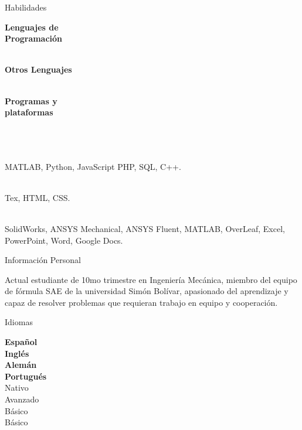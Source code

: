 \documentclass[10pt]{article}
\begin{document}
\begin{multicols}{2}
    \begin{LARGE}
        \color{blue!50!black}Habilidades\par
    \end{LARGE}
    \begin{vwcol}[widths={0.4,0.6},
 sep=0cm,rule=0pt,indent=0em,lines=10]
        \textbf{Lenguajes de \\
        Programación}\par\hfill\\
        \textbf{Otros Lenguajes}\par\hfill\\
        \textbf{Programas y\\ plataformas}\par\hfill\\\hfill\\\hfill\\
        MATLAB, Python, JavaScript PHP, SQL, C++.\par\hfill\\
        Tex, HTML, CSS.\par\hfill\\
        SolidWorks, ANSYS Mechanical, ANSYS Fluent, MATLAB, OverLeaf, Excel, PowerPoint, Word, Google Docs.\par
    \end{vwcol}
    \columnbreak
    \begin{LARGE}
        \color{blue!50!black} Información Personal\par
    \end{LARGE}
    Actual estudiante de 10mo trimestre en Ingeniería Mecánica, miembro del equipo de fórmula SAE de la universidad Simón Bolívar, apasionado del aprendizaje y capaz de resolver problemas que requieran trabajo en equipo y cooperación.\par
    \begin{LARGE}
        \color{blue!50!black} Idiomas\par
    \end{LARGE}
    \begin{vwcol}[widths={0.235,0.765},
 sep=.8cm,rule=0pt,indent=0em,lines=4]
        \textbf{Español}\\
        \textbf{Inglés}\\
        \textbf{Alemán}\\
        \textbf{Portugués}\\
        Nativo\\
        Avanzado\\
        Básico\\
        Básico\\
    \end{vwcol}
\end{multicols}
\end{document}
